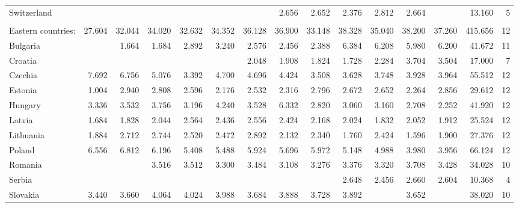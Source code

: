 \begin{tabular}{lrrrrrrrrrrrrrr}
  \hspace{5mm} Switzerland &  &  &  &  &  &  & 2.656 & 2.652 & 2.376 & 2.812 & 2.664 &  & 13.160 &   5 \\ 
  \multicolumn{14}{l}{\phantom{empty}} \\
  Eastern countries: & 27.604 & 32.044 & 34.020 & 32.632 & 34.352 & 36.128 & 36.900 & 33.148 & 38.328 & 35.040 & 38.200 & 37.260 & 415.656 &  12 \\ 
  \hspace{5mm} Bulgaria &  & 1.664 & 1.684 & 2.892 & 3.240 & 2.576 & 2.456 & 2.388 & 6.384 & 6.208 & 5.980 & 6.200 & 41.672 &  11 \\ 
  \hspace{5mm} Croatia &  &  &  &  &  & 2.048 & 1.908 & 1.824 & 1.728 & 2.284 & 3.704 & 3.504 & 17.000 &   7 \\ 
  \hspace{5mm} Czechia & 7.692 & 6.756 & 5.076 & 3.392 & 4.700 & 4.696 & 4.424 & 3.508 & 3.628 & 3.748 & 3.928 & 3.964 & 55.512 &  12 \\ 
  \hspace{5mm} Estonia & 1.004 & 2.940 & 2.808 & 2.596 & 2.176 & 2.532 & 2.316 & 2.796 & 2.672 & 2.652 & 2.264 & 2.856 & 29.612 &  12 \\ 
  \hspace{5mm} Hungary & 3.336 & 3.532 & 3.756 & 3.196 & 4.240 & 3.528 & 6.332 & 2.820 & 3.060 & 3.160 & 2.708 & 2.252 & 41.920 &  12 \\ 
  \hspace{5mm} Latvia & 1.684 & 1.828 & 2.044 & 2.564 & 2.436 & 2.556 & 2.424 & 2.168 & 2.024 & 1.832 & 2.052 & 1.912 & 25.524 &  12 \\ 
  \hspace{5mm} Lithuania & 1.884 & 2.712 & 2.744 & 2.520 & 2.472 & 2.892 & 2.132 & 2.340 & 1.760 & 2.424 & 1.596 & 1.900 & 27.376 &  12 \\ 
  \hspace{5mm} Poland & 6.556 & 6.812 & 6.196 & 5.408 & 5.488 & 5.924 & 5.696 & 5.972 & 5.148 & 4.988 & 3.980 & 3.956 & 66.124 &  12 \\ 
  \hspace{5mm} Romania &  &  & 3.516 & 3.512 & 3.300 & 3.484 & 3.108 & 3.276 & 3.376 & 3.320 & 3.708 & 3.428 & 34.028 &  10 \\ 
  \hspace{5mm} Serbia &  &  &  &  &  &  &  &  & 2.648 & 2.456 & 2.660 & 2.604 & 10.368 &   4 \\ 
  \hspace{5mm} Slovakia & 3.440 & 3.660 & 4.064 & 4.024 & 3.988 & 3.684 & 3.888 & 3.728 & 3.892 &  & 3.652 &  & 38.020 &  10 \\ 

\end{tabular}
